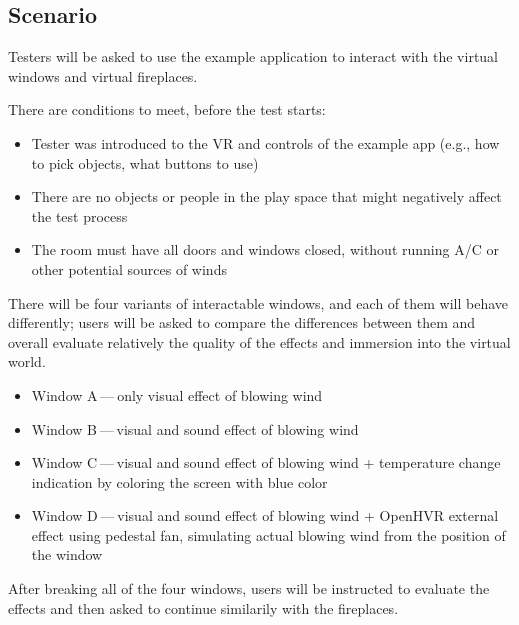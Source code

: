 \hypertarget{x-scenario}{\subsection{Scenario}}
Testers will be asked to use the example application to interact with 
the virtual windows and virtual fireplaces.

There are conditions to meet, before the test starts:

\begin{itemize}

\item Tester was introduced to the VR and controls of
the example app (e.g., how to pick objects, what buttons to use)

\item There are no objects or people in the play space that might negatively affect
the test process

\item The room must have all doors and windows closed, without running A/C
or other potential sources of winds

\end{itemize}


There will be four variants of interactable windows, and each of them will
behave differently; users will be asked to compare the differences between
them and overall evaluate relatively the quality of the effects and
immersion into the virtual world.


\begin{itemize}

\item Window A — only visual effect of blowing wind

\item Window B — visual and sound effect of blowing wind

\item Window C — visual and sound effect of blowing wind + temperature change
indication by coloring the screen with blue color

\item Window D — visual and sound effect of blowing wind + OpenHVR external effect
using pedestal fan, simulating actual blowing wind from the position of
the window

\end{itemize}


After breaking all of the four windows, users will be instructed to evaluate
the effects and then asked to continue similarily with the fireplaces.


